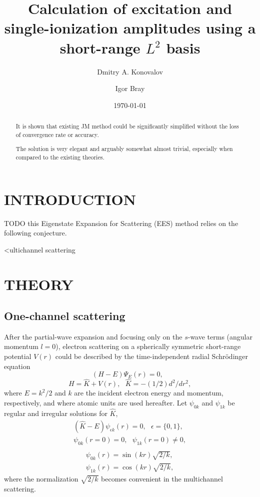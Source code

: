 \documentclass[aip
, pra
, showpacs
, aps
, twocolumn
, groupedaddress
, floatfix
]{revtex4}
\newcommand{\beq}{\begin{equation}}
\newcommand{\eeq}{\end{equation}}
\newcommand{\barr}{\begin{array}}
\newcommand{\earr}{\end{array}}
\begin{document}
\title {Calculation of excitation and single-ionization amplitudes using a short-range $L^2$ basis}

\author{Dmitry A. Konovalov}

\author{Igor Bray}


\date{\today}

\begin{abstract}
It is shown that existing JM method could be significantly simplified without the loss of convergence rate or accuracy.


The solution is very elegant and arguably somewhat almost trivial, especially when compared to
the existing theories.

\end{abstract}

\maketitle

\section{INTRODUCTION}
TODO
this Eigenstate Expansion for Scattering (EES) method relies on the following conjecture.

<ultichannel scattering \cite{CA73, NO72, TF79, Nesbet78, Lucchese86}

\section{THEORY}
\subsection{One-channel scattering}


After the partial-wave expansion \cite{Taylor72,N82} and focusing only on the $s$-wave terms (angular momentum $l=0$),
electron scattering on a spherically symmetric short-range potential $V(r)$
could be described by the time-independent radial Schr\"odinger equation
\beq
(H-E) \Psi_E (r) =0,  \ \ \  \label{H_E_Psi_E}
\eeq
\beq
H = \hat{K} + V(r), \ \ \ \hat{K} = -(1/2) d^2/dr^2,
\eeq
where $E=k^2/2$ and $k$ are the incident electron energy and momentum, respectively, and where
atomic units are used hereafter.
Let $\psi_{0k}$ and $\psi_{1k}$ be regular and irregular solutions for $\hat{K}$,
\beq \barr{l}
(\hat{K}-E)  \psi_{\epsilon k} (r) =0, \ \ \ \epsilon=\{0,1\},\\
\psi_{0k}(r=0) = 0, \ \ \ \psi_{1k}(r=0) \neq 0,\\
\earr \label{H_0_E_psi}\eeq
\beq \barr{l}
\psi_{0k}(r) = \sin(kr) \sqrt{2/k},\\
\psi_{1k}(r) = \cos(kr) \sqrt{2/k},
\earr \label{K} \eeq
where the normalization $\sqrt{2/k}$ becomes convenient in the multichannel scattering.
\end{document}
